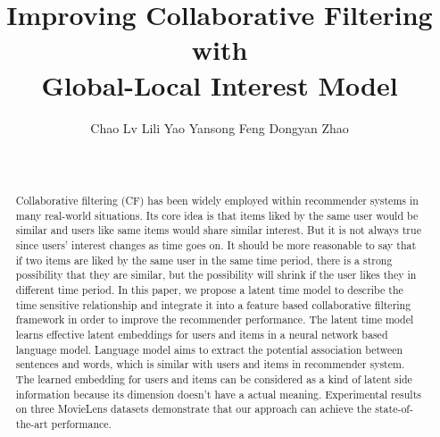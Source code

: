 \documentclass{sig-alternate-05-2015}
\begin{document}

\title{Improving Collaborative Filtering with\\
Global-Local Interest Model}

\author{
\alignauthor
Chao Lv \quad
Lili Yao \quad
Yansong Feng \quad
Dongyan Zhao\\
\\
\\
}

\maketitle

\begin{abstract}
Collaborative filtering (CF) has been widely employed within
recommender systems in many real-world situations.
Its core idea is that items liked by the same user would be similar and
users like same items would share similar interest.
But it is not always true since users' interest changes as time goes on.
It should be more reasonable to say that
if two items are liked by the same user in the same time period,
there is a strong possibility that they are similar,
but the possibility will shrink if the user likes they in different time period.
In this paper,
we propose a latent time model to describe the time sensitive relationship
and integrate it into a feature based collaborative filtering framework
in order to improve the recommender performance.
The latent time model learns effective latent embeddings
for users and items in a neural network based language model.
Language model aims to extract the potential association
between sentences and words,
which is similar with users and items in recommender system.
The learned embedding for users and items can be considered as
a kind of latent side information because its dimension doesn't
have a actual meaning.
Experimental results on three MovieLens datasets demonstrate that
our approach can achieve the state-of-the-art performance.
\end{abstract}

\end{document}
